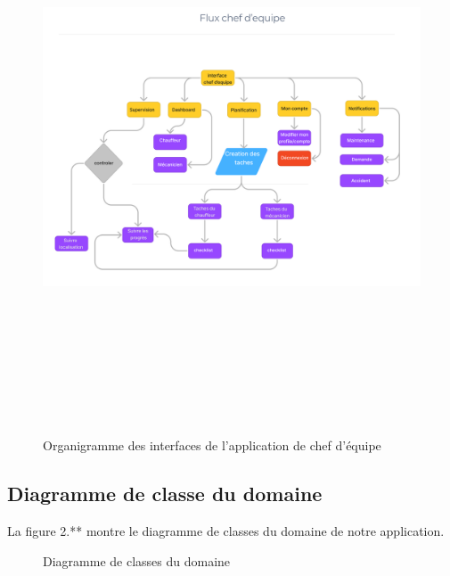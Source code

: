 \begin{figure}[htbp]
  \centering
  \includegraphics[width=1.05\textwidth,height=17cm]{chap2.images/org chef d'equipe.png}
  \caption{Organigramme des interfaces de l'application de chef d'équipe}
\end{figure}
    



\newpage
\subsection{Diagramme de classe du domaine}

La figure 2.** montre le diagramme de classes du domaine de notre application.

        
   
     \begin{figure}[h!]
       \centering
       \caption{Diagramme de classes du domaine}
     \end{figure}
     \newpage





